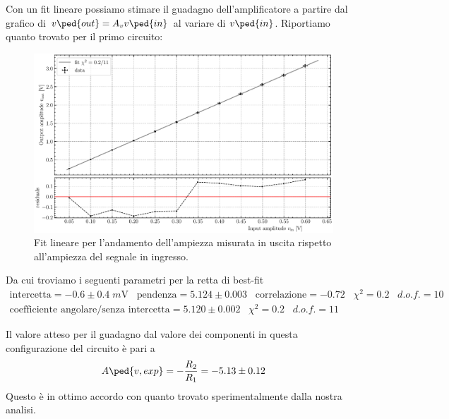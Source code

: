 \documentclass[10pt, a4paper, italian]{article}
\begin{document}
Con un fit lineare possiamo stimare il guadagno dell'amplificatore a partire
dal grafico di $v\ped{out} = A_v v\ped{in}$ al variare di $v\ped{in}$.
Riportiamo quanto trovato per il primo circuito:
\begin{figure}[htbp]
\centering
\includegraphics[scale=0.7]{gain5k1}
\caption{Fit lineare per l'andamento dell'ampiezza misurata in uscita rispetto
all'ampiezza del segnale in ingresso. \label{fig: gainfit}}
\end{figure}
Da cui troviamo i seguenti parametri per la retta di best-fit
\begin{align*}
\mathrm{intercetta} = -0.6 \pm 0.4 \; \si{m\V} \;\;\;\mathrm{pendenza} = 5.124 \pm 0.003 \;\;\;\mathrm{correlazione} 
= -0.72 \;\;\; \chi^2 = 0.2 \;\;\; d.o.f. = 10 \\
\text{coefficiente angolare/senza intercetta} = 5.120 \pm 0.002 \;\;\;
\chi^2 = 0.2 \;\;\; d.o.f. = 11
\end{align*}

Il valore atteso per il guadagno dal valore dei componenti in questa
configurazione del circuito è pari a
\[
A\ped{v, exp} = -\frac{R_2}{R_1} = - 5.13 \pm 0.12
\]
Questo è in ottimo accordo con quanto trovato sperimentalmente dalla nostra
analisi.
\end{document}

